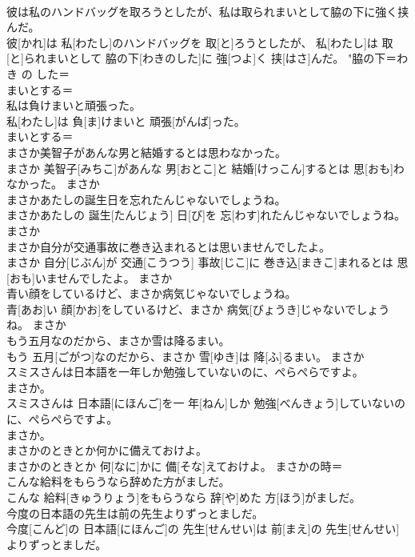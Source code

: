 \documentclass[8pt]{extreport}
\begin{document}
\begin{CJK}{UTF8}{min}
\\	彼は私のハンドバッグを取ろうとしたが、私は取られまいとして脇の下に強く挟んだ。	
\\	彼[かれ]は 私[わたし]のハンドバッグを 取[と]ろうとしたが、 私[わたし]は 取[と]られまいとして 脇の下[わきのした]に 強[つよ]く 挟[はさ]んだ。	"脇の下＝わき の した＝ 
\\	まいとする＝ 
\\	私は負けまいと頑張った。	
\\	私[わたし]は 負[ま]けまいと 頑張[がんば]った。	
\\	まいとする＝ 
\\	まさか美智子があんな男と結婚するとは思わなかった。	
\\	まさか 美智子[みちこ]があんな 男[おとこ]と 結婚[けっこん]するとは 思[おも]わなかった。	まさか 
\\	まさかあたしの誕生日を忘れたんじゃないでしょうね。	
\\	まさかあたしの 誕生[たんじょう] 日[び]を 忘[わす]れたんじゃないでしょうね。	まさか 
\\	まさか自分が交通事故に巻き込まれるとは思いませんでしたよ。	
\\	まさか 自分[じぶん]が 交通[こうつう] 事故[じこ]に 巻き込[まきこ]まれるとは 思[おも]いませんでしたよ。	まさか 
\\	青い顔をしているけど、まさか病気じゃないでしょうね。	
\\	青[あお]い 顔[かお]をしているけど、まさか 病気[びょうき]じゃないでしょうね。	まさか 
\\	もう五月なのだから、まさか雪は降るまい。	
\\	もう 五月[ごがつ]なのだから、まさか 雪[ゆき]は 降[ふ]るまい。	まさか 
\\	スミスさんは日本語を一年しか勉強していないのに、ぺらぺらですよ。 
\\	まさか。	
\\	スミスさんは 日本語[にほんご]を一 年[ねん]しか 勉強[べんきょう]していないのに、ぺらぺらですよ。 
\\	まさか。	
\\	まさかのときとか何かに備えておけよ。	
\\	まさかのときとか 何[なに]かに 備[そな]えておけよ。	まさかの時＝ 
\\	こんな給料をもらうなら辞めた方がましだ。	
\\	こんな 給料[きゅうりょう]をもらうなら 辞[や]めた 方[ほう]がましだ。	
\\	今度の日本語の先生は前の先生よりずっとましだ。	
\\	今度[こんど]の 日本語[にほんご]の 先生[せんせい]は 前[まえ]の 先生[せんせい]よりずっとましだ。	

\end{CJK}
\end{document}

